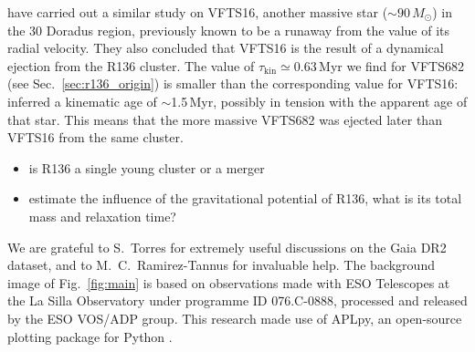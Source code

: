 \documentclass{aa}
\DeclareRobustCommand{\Figref}[1]{Fig.~\ref{#1}}
\DeclareRobustCommand{\Secref}[1]{Sec.~\ref{#1}}
\begin{document}
\cite{lennon:18} have carried out a similar study on VFTS16, another
massive star ($\sim90\,M_\odot$) in the 30 Doradus region, previously
known to be a runaway from the value of
its radial velocity. They also concluded that VFTS16 is 
the result of a dynamical ejection from the R136 cluster. 
The value of $\tau_\mathrm{kin}\simeq0.63$\,Myr we find for VFTS682 (see \Secref{sec:r136_origin}) is smaller
than the corresponding value for VFTS16: \cite{lennon:18} inferred a kinematic age of
$\sim$1.5\,Myr, possibly in tension with the apparent age of that star. This means that the more
massive VFTS682 was ejected later than VFTS16 from the same cluster.



\begin{itemize}
\item is R136 a single young cluster or a merger
\item estimate the influence of the gravitational potential of R136,
  what is its total mass and relaxation time?
\end{itemize}





\begin{acknowledgements}
  We are grateful to S.~Torres for extremely useful discussions on the
  Gaia DR2 dataset, and to M.~C.~Ramirez-Tannus for invaluable help.
  The background image of \Figref{fig:main} is based on observations
  made with ESO Telescopes at the La Silla Observatory under programme
  ID 076.C-0888, processed and released by the ESO VOS/ADP group.
  This research made use of APLpy, an open-source plotting package for Python \citep[][]{robitaille:12}.
\end{acknowledgements}
\end{document}
